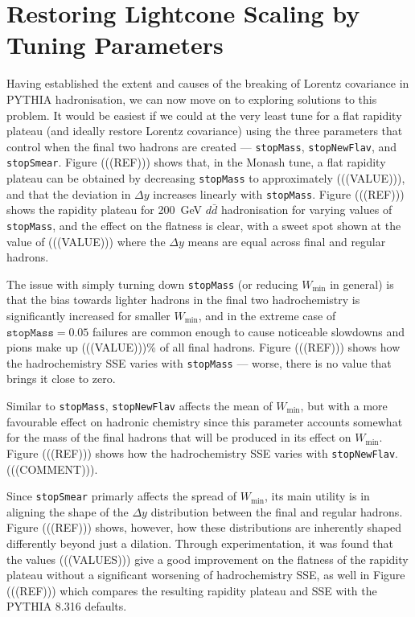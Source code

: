 \documentclass[12pt,a4paper]{report}
\begin{document}
\section{Restoring Lightcone Scaling by Tuning Parameters}
Having established the extent and causes of the breaking of Lorentz covariance in PYTHIA hadronisation, we can now move on to exploring solutions to this problem. It would be easiest if we could at the very least tune for a flat rapidity plateau (and ideally restore Lorentz covariance) using the three parameters that control when the final two hadrons are created --- \texttt{stopMass}, \texttt{stopNewFlav}, and \texttt{stopSmear}. Figure (((REF))) shows that, in the Monash tune, a flat rapidity plateau can be obtained by decreasing \texttt{stopMass} to approximately (((VALUE))), and that the deviation in $\Delta y$ increases linearly with \texttt{stopMass}. Figure (((REF))) shows the rapidity plateau for \qty{200}{\giga\electronvolt} $d\bar{d}$ hadronisation for varying values of \texttt{stopMass}, and the effect on the flatness is clear, with a sweet spot shown at the value of (((VALUE))) where the $\Delta y$ means are equal across final and regular hadrons.

The issue with simply turning down \texttt{stopMass} (or reducing $W_\text{min}$ in general) is that the bias towards lighter hadrons in the final two hadrochemistry is significantly increased for smaller $W_\text{min}$, and in the extreme case of $\texttt{stopMass} = 0.05$ failures are common enough to cause noticeable slowdowns and pions make up (((VALUE)))\% of all final hadrons. Figure (((REF))) shows how the hadrochemistry SSE varies with \texttt{stopMass} --- worse, there is no value that brings it close to zero.

Similar to \texttt{stopMass}, \texttt{stopNewFlav} affects the mean of $W_\text{min}$, but with a more favourable effect on hadronic chemistry since this parameter accounts somewhat for the mass of the final hadrons that will be produced in its effect on $W_\text{min}$. Figure (((REF))) shows how the hadrochemistry SSE varies with \texttt{stopNewFlav}. (((COMMENT))).

Since \texttt{stopSmear} primarly affects the spread of $W_\text{min}$, its main utility is in aligning the shape of the $\Delta y$ distribution between the final and regular hadrons. Figure (((REF))) shows, however, how these distributions are inherently shaped differently beyond just a dilation. Through experimentation, it was found that the values (((VALUES))) give a good improvement on the flatness of the rapidity plateau without a significant worsening of hadrochemistry SSE, as well in Figure (((REF))) which compares the resulting rapidity plateau and SSE with the PYTHIA 8.316 defaults. 
\end{document}
